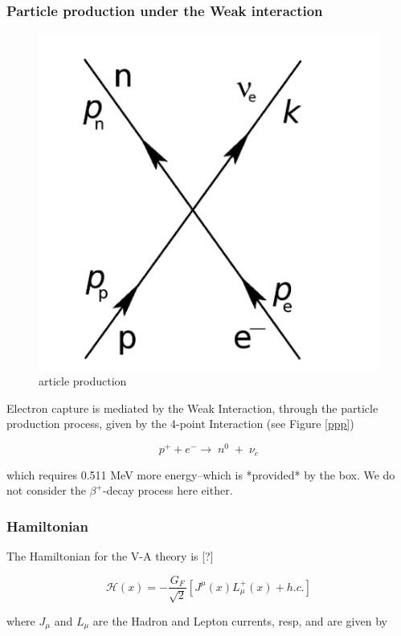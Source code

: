 \documentclass[11pt]{amsart}
\begin{document}
\subsubsection{Particle production under the Weak interaction}

\begin{figure}
   \includegraphics[scale=0.25]{img/feynman.png}
   \caption{article production}
  \label{fig:ppp}
\end{figure}

Electron capture is mediated by the Weak Interaction, through the particle production process, given by the 4-point Interaction (see Figure \ref{ppp})

$$p^{+}+e^{-}\rightarrow\;n^{0}\;+\;\nu{_e}$$

which requires 0.511 MeV more energy--which is *provided* by the box. We do not consider the $\beta^{+}$-decay process here either.

\subsubsection{Hamiltonian}

The Hamiltonian for the V-A theory is [?]

$$\mathcal{H}(x)=-\dfrac{G_{F}}{\sqrt{2}}\left[J^{\mu}(x)L^{+}_{\mu}(x)+h.c.\right]$$

where $J_{\mu}$ and $L_{\mu}$ are the Hadron and Lepton currents, resp, and are given by
\end{document}
